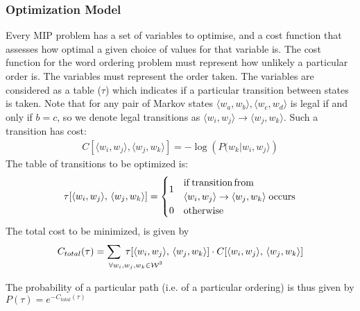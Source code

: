 \documentclass[twocolumn]{article}
\begin{document}
\subsubsection{Optimization Model}
Every MIP problem has a set of variables to optimise, and a cost function that assesses how optimal a given choice of values for that variable is. The cost function for the word ordering problem must represent how unlikely a particular order is. The variables must represent the order taken. The variables are considered as a table ($\tau$) which indicates if a particular transition between states is taken. Note that for any pair of Markov states $\langle w_{a},w_{b}\rangle,\langle w_{c},w_{d}\rangle$ is legal if and only if $b=c$, so we denote legal transitions as $\langle w_{i},w_{j}\rangle \to \langle w_{j},w_{k}\rangle$.
%
Such a transition has cost:
\begin{gather*}
	C[\langle w_{i},w_{j}\rangle,\langle w_{j},w_{k}\rangle]=-\log\left(P(w_{k}|w_{i},w_{j}\rangle\right)
\end{gather*} 
%
The table of transitions to be optimized is:
\displayunskip
\begin{gather*}
 \tau[\langle w_{i},w_{j}\rangle,\,\langle w_{j},w_{k}\rangle] = %
 \begin{cases}
	 \multirow{2}{*}{1} & \mathrm{if\,transition\,from} \\
	 	                & \langle w_{i},w_{j}\rangle \to \langle w_{j},w_{k}\rangle
	 	                   \;\mathrm{ occurs} \\
                     0  & \mathrm{otherwise}
  \end{cases}
\end{gather*}
%
The total cost to be minimized, is given by
\displayunskip
\begin{gather*}
 C_{total}(\tau)= \sum_{\mathrlap{\!\!\!\!\forall w_i,w_j,w_k \in \W^{3}
 	}}
 	\;\tau[\langle w_{i},w_{j}\rangle,\,\langle w_{j},w_{k}\rangle] \cdot C[\langle w_{i},w_{j}\rangle,\,\langle w_{j},w_{k}\rangle]
\end{gather*}


The probability of a particular path (i.e. of a particular ordering)
is thus given by $P(\tau)=e^{-C_{total}(\tau)}$
\end{document}
